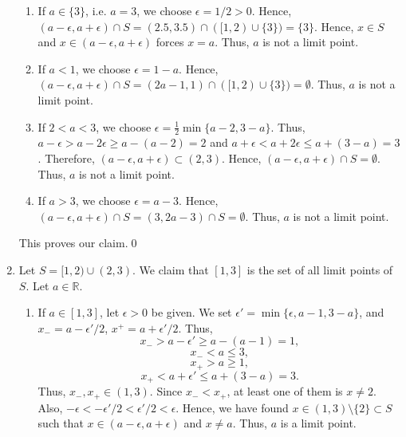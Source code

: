 \documentclass[10pt]{article}
\begin{document}
\begin{enumerate}
\begin{enumerate}
                        \item If $a \in \{3\}$, i.e. $a = 3$, we choose $\epsilon = 1 /2 > 0$. Hence,
                        $(a - \epsilon, a + \epsilon) \cap S = (2.5, 3.5) \cap ([1, 2) \cup \{3\}) = \{3\}$.
                        Hence, $x \in S$ and $x \in (a - \epsilon, a + \epsilon)$ forces $x = a$.
                        Thus, $a$ is not a limit point.

                        \item If $a < 1$, we choose $\epsilon = 1 - a$. Hence, $(a - \epsilon, a + \epsilon) \cap S =
                        (2a - 1, 1) \cap ([1, 2) \cup \{3\}) = \emptyset$. Thus, $a$ is not a limit point.

                        \item If $2 < a < 3$, we choose $\epsilon = \frac{1}{2}\min\{a-2, 3-a\}$. Thus,
                        $a - \epsilon > a - 2\epsilon \ge a - (a - 2) = 2$ and $a + \epsilon < a + 2\epsilon \le a + (3 - a) = 3$.
                        Therefore, $(a - \epsilon, a + \epsilon) \subset (2, 3)$.
                        Hence, $(a - \epsilon, a + \epsilon) \cap S = \emptyset$.
                        Thus, $a$ is not a limit point.

                        \item If $a > 3$, we choose $\epsilon = a - 3$. Hence, $(a - \epsilon, a + \epsilon) \cap S =
                        (3, 2a - 3) \cap S = \emptyset$.
                        Thus, $a$ is not a limit point.
                \end{enumerate}
                This proves our claim.\qed

                \item Let $S = [1, 2) \cup (2, 3)$. We claim that $[1, 3]$ is the set of all limit points of $S$.
                Let $a \in \mathbb{R}$.
                \begin{enumerate}
                        \item If $a \in [1, 3]$, let $\epsilon > 0$ be given. We set $\epsilon' = \min\{\epsilon, a - 1, 3 - a\}$,
                        and $x_- = a - \epsilon'/2$, $x^+ = a + \epsilon'/2$. Thus, $$x_- > a - \epsilon' \ge a - (a - 1) = 1,$$
                        $$x_- < a \le 3,$$ $$x_+ > a \ge 1,$$ $$x_+ < a + \epsilon' \le a + (3 - a) = 3.$$
                        Thus, $x_-, x_+ \in (1, 3)$. Since $x_- < x_+$, at least one of them is $x \neq 2$.
                        Also, $-\epsilon < -\epsilon'/2 < \epsilon'/2 < \epsilon$.
                        Hence, we have found $x \in (1, 3)\setminus\{2\} \subset S$ such that $x \in (a - \epsilon, a + \epsilon)$ and
                        $x \neq a$. Thus, $a$ is a limit point.


\end{enumerate}
\end{enumerate}
\end{document}
